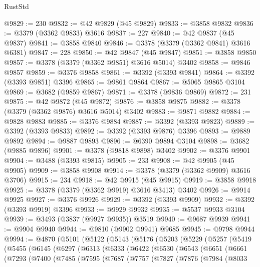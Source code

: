 \begin{lexlean}{RustStd}
\begin{coremodule}
@9829 := 230
@9832 := @42 @9829 (@45 @9829)
@9833 := @3858 @9832
@9836 := @3379 (@3362 @9833) @3616
@9837 := 227
@9840 := @42 @9837 (@45 @9837)
@9841 := @3858 @9840
@9846 := @3378 (@3379 (@3362 @9841) @3616 @6381)
@9847 := 228
@9850 := @42 @9847 (@45 @9847)
@9851 := @3858 @9850
@9857 := @3378 (@3379 (@3362 @9851) @3616 @5014) @3402
@9858 := @9846 @9857
@9859 := @3376 @9858
@9861 := @3392 (@3393 @9841)
@9864 := @3392 (@3393 @9851) @3396
@9865 := @9861 @9864
@9867 := @5065 @9865 @3104
@9869 := @3682 (@9859 @9867)
@9871 := @3378 (@9836 @9869)
@9872 := 231
@9875 := @42 @9872 (@45 @9872)
@9876 := @3858 @9875
@9882 := @3378 (@3379 (@3362 @9876) @3616 @5014) @3402
@9883 := @9871 @9882
@9884 := @9828 @9883
@9885 := @3376 @9884
@9887 := @3392 (@3393 @9823)
@9889 := @3392 (@3393 @9833)
@9892 := @3392 (@3393 @9876) @3396
@9893 := @9889 @9892
@9894 := @9887 @9893
@9896 := @6390 @9894 @3104
@9898 := @3682 (@9885 @9896)
@9901 := @3378 (@9818 @9898) @3402
@9902 := @3376 @9901
@9904 := @3488 (@3393 @9815)
@9905 := 233
@9908 := @42 @9905 (@45 @9905)
@9909 := @3858 @9908
@9914 := @3378 (@3379 (@3362 @9909) @3616 @3706)
@9915 := 234
@9918 := @42 @9915 (@45 @9915)
@9919 := @3858 @9918
@9925 := @3378 (@3379 (@3362 @9919) @3616 @3413) @3402
@9926 := @9914 @9925
@9927 := @3376 @9926
@9929 := @3392 (@3393 @9909)
@9932 := @3392 (@3393 @9919) @3396
@9933 := @9929 @9932
@9935 := @5537 @9933 @3104
@9939 := @3493 (@3837 (@9927 @9935)) @3519
@9940 := @9687 @9939
@9941 := @9904 @9940
@9944 := @9810 (@9902 @9941) @9685
@9945 := @9798 @9944
@9994 := @4870
    (@5101
      (@5122
        (@5143
          (@5176
            (@5203
              (@5229
                (@5257
                  (@5419
                    (@5455
                      (@6145
                        (@6297
                          (@6313
                            (@6333
                              (@6422
                                (@6530
                                  (@6543
                                    (@6651
                                      (@6661
                                        (@7293
                                          (@7400
                                            (@7485
                                              (@7595
                                                (@7687
                                                  (@7757
                                                    (@7827
                                                      (@7876
                                                        (@7984
                                                          (@8033

\end{coremodule}
\end{lexlean}

